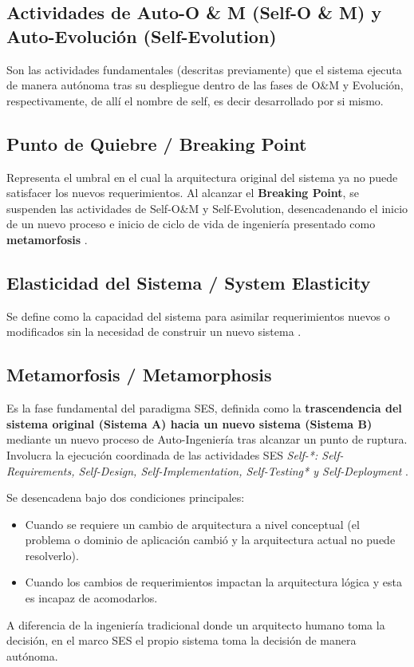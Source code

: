 \documentclass[12pt, letterpaper, oneside]{book}
\begin{document}
\subsection{Actividades de Auto-O \& M (Self-O \& M)  y Auto-Evolución (Self-Evolution)}
Son las actividades fundamentales (descritas previamente) que el sistema ejecuta de manera autónoma tras su despliegue dentro de las fases de O\&M y Evolución, respectivamente, de allí el nombre de self, es decir desarrollado por si mismo.
\subsection{Punto de Quiebre / Breaking Point}
Representa el umbral en el cual la arquitectura original del sistema ya no puede satisfacer los nuevos requerimientos.
Al alcanzar el \textbf{Breaking Point}, se suspenden las actividades de Self-O\&M y Self-Evolution, desencadenando el inicio de un nuevo proceso e inicio de ciclo de vida de ingeniería presentado como \textbf{metamorfosis} \cite{PerezCarrillo2026}.
\subsection{Elasticidad del Sistema / System Elasticity}
Se define como la capacidad del sistema para asimilar requerimientos nuevos o modificados sin la necesidad de construir un nuevo sistema \cite{PerezCarrillo2026}.
\subsection{Metamorfosis / Metamorphosis}

Es la fase fundamental del paradigma SES, definida como la \textbf{trascendencia del sistema original (Sistema A) hacia un nuevo sistema (Sistema B)} mediante un nuevo proceso de Auto-Ingeniería tras alcanzar un punto de ruptura.
Involucra la ejecución coordinada de las actividades SES \textit{Self-*: Self-Requirements, Self-Design, Self-Implementation, Self-Testing* y Self-Deployment} \cite{PerezCarrillo2026}.

Se desencadena bajo dos condiciones principales:
\begin{itemize}
	\item  Cuando se requiere un cambio de arquitectura a nivel conceptual (el problema o dominio de aplicación cambió y la arquitectura actual no puede resolverlo).
	\item Cuando los cambios de requerimientos impactan la arquitectura lógica y esta es incapaz de acomodarlos.
\end{itemize}
A diferencia de la ingeniería tradicional donde un arquitecto humano toma la decisión, en el marco SES el propio sistema toma la decisión de manera autónoma.
\end{document}
